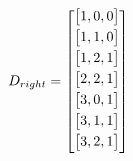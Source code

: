 \documentclass{article}
\begin{document}
\begin{center}
\begin{minipage}{0.2\textwidth}
            $$D_{right} = 
        \begin{bmatrix}
            \vspace{1mm}
            \begin{bmatrix}
             1, 0, 0 \\
             \end{bmatrix} \\
            \vspace{1mm}
             \begin{bmatrix}
             1,1,0 \\ 
             \end{bmatrix} \\
            \vspace{1mm}
             \begin{bmatrix}
             1,2,1 \\ 
             \end{bmatrix} \\
        \vspace{1mm}
         \begin{bmatrix}
         2,2,1 \\ 
         \end{bmatrix} \\
        \vspace{1mm}
         \begin{bmatrix}
         3,0,1 \\
         \end{bmatrix} \\
        \vspace{1mm}
         \begin{bmatrix}
         3,1,1 \\
         \end{bmatrix} \\
        \vspace{1mm}
         \begin{bmatrix}
         3,2,1 \\
        \end{bmatrix} \\
         \end{bmatrix}
        $$
\end{minipage}\quad
\end{center}
\end{document}
